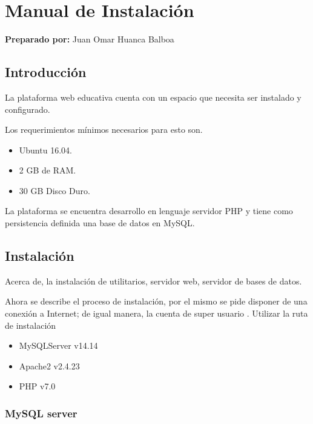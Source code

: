 \chapter{Manual de Instalación}

\begin{center}
	\textbf{Preparado por:} Juan Omar Huanca Balboa
\end{center}

\section{Introducción}

La plataforma web educativa cuenta con un espacio que necesita ser instalado y configurado.

Los requerimientos mínimos necesarios para esto son.

\begin{itemize}

\item Ubuntu 16.04.
\item 2 GB de RAM.
\item 30 GB Disco Duro.

\end{itemize}

La plataforma se encuentra desarrollo en lenguaje servidor PHP y tiene como 
persistencia definida una base de datos en MySQL.

\section{Instalación}

Acerca de, la instalación de utilitarios, servidor web, servidor de bases de
datos.

Ahora se describe el proceso de instalación, por el mismo se pide disponer
de una conexión a Internet; de igual manera, la cuenta de super usuario 
. Utilizar la ruta de instalación 

\begin{itemize}

\item MySQLServer v14.14
\item Apache2 v2.4.23
\item PHP v7.0
\end{itemize}

\subsection{MySQL server} \label{ssec:mysqlServer}

